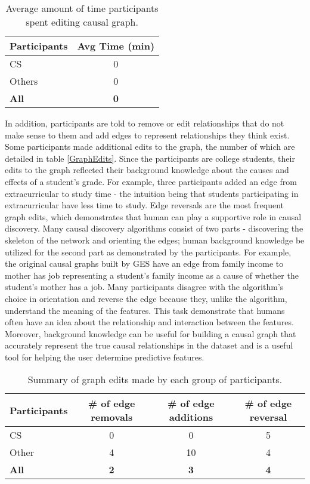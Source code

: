 \begin{table}[]
\centering
\begin{tabular}{lc}
\hline
Participants & Avg Time (min) \\ \hline
CS           &        0        \\
Others       &       0         \\ \hline
\textbf{All} & \textbf{0}    \\ \hline
\end{tabular}
\caption{Average amount of time participants spent editing causal graph. }
\label{GraphEditTimes}
\end{table}

In addition, participants are told to remove or edit relationships that do not make sense to them and add edges to represent relationships they think exist. Some participants made additional edits to the graph, the number of which are detailed in table \ref{GraphEdits}. Since the participants are college students, their edits to the graph reflected their background knowledge about the causes and effects of a student's grade. For example, three participants added an edge from extracurricular to study time - the intuition being that students participating in extracurricular have less time to study. Edge reversals are the most frequent graph edits, which demonstrates that human can play a supportive role in causal discovery. Many causal discovery algorithms consist of two parts - discovering the skeleton of the network and orienting the edges; human background knowledge be utilized for the second part as demonstrated by the participants. For example, the original causal graphs built by GES have an edge from family income to mother has job representing a student's family income as a cause of whether the student's mother has a job. Many participants disagree with the algorithm's choice in orientation and reverse the edge because they, unlike the algorithm, understand the meaning of the features. This task demonstrate that humans often have an idea about the relationship and interaction between the features. Moreover, background knowledge can be useful for building a causal graph that accurately represent the true causal relationships in the dataset and is a useful tool for helping the user determine predictive features.

\begin{table}[]
\centering
\begin{tabular}{lccc}
\hline
Participants & \# of edge removals & \# of edge additions & \# of edge reversal \\ \hline
CS           & 0             & 0              & 5           \\
Other      & 4             & 10             & 4             \\ \hline
\textbf{All} & \textbf{2}    & \textbf{3}     & \textbf{4}    \\ \hline
\end{tabular}
\caption {Summary of graph edits made by each group of participants.}
\label{graphedits}
\end{table}

